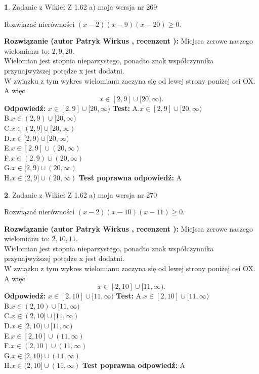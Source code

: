 \documentclass[12pt, a4paper]{article}
\theoremstyle{definition} %
\newtheorem{zad}{}
\newcommand{\zadStart}[1]{\begin{zad}#1\newline}
\newcommand{\zadStop}{\end{zad}}
\newcommand{\rozwStart}[2]{\noindent \textbf{Rozwiązanie (autor #1 , recenzent #2): }\newline}
\newcommand{\rozwStop}{\newline}
\newcommand{\odpStart}{\noindent \textbf{Odpowiedź:}\newline}
\newcommand{\odpStop}{\newline}
\newcommand{\testStart}{\noindent \textbf{Test:}\newline}
\newcommand{\testStop}{\newline}
\newcommand{\kluczStart}{\noindent \textbf{Test poprawna odpowiedź:}\newline}
\newcommand{\kluczStop}{\newline}
\begin{document}
\zadStart{Zadanie z Wikieł Z 1.62 a) moja wersja nr 269}

Rozwiązać nierówności $(x-2)(x-9)(x-20)\ge0$.
\zadStop
\rozwStart{Patryk Wirkus}{}
Miejsca zerowe naszego wielomianu to: $2, 9, 20$.\\
Wielomian jest stopnia nieparzystego, ponadto znak współczynnika przy\linebreak najwyższej potędze x jest dodatni.\\ W związku z tym wykres wielomianu zaczyna się od lewej strony poniżej osi OX. A więc $$x \in [2,9] \cup [20,\infty).$$
\rozwStop
\odpStart
$x \in [2,9] \cup [20,\infty)$
\odpStop
\testStart
A.$x \in [2,9] \cup [20,\infty)$\\
B.$x \in (2,9) \cup [20,\infty)$\\
C.$x \in (2,9] \cup [20,\infty)$\\
D.$x \in [2,9) \cup [20,\infty)$\\
E.$x \in [2,9] \cup (20,\infty)$\\
F.$x \in (2,9) \cup (20,\infty)$\\
G.$x \in [2,9) \cup (20,\infty)$\\
H.$x \in (2,9] \cup (20,\infty)$
\testStop
\kluczStart
A
\kluczStop



\zadStart{Zadanie z Wikieł Z 1.62 a) moja wersja nr 270}

Rozwiązać nierówności $(x-2)(x-10)(x-11)\ge0$.
\zadStop
\rozwStart{Patryk Wirkus}{}
Miejsca zerowe naszego wielomianu to: $2, 10, 11$.\\
Wielomian jest stopnia nieparzystego, ponadto znak współczynnika przy\linebreak najwyższej potędze x jest dodatni.\\ W związku z tym wykres wielomianu zaczyna się od lewej strony poniżej osi OX. A więc $$x \in [2,10] \cup [11,\infty).$$
\rozwStop
\odpStart
$x \in [2,10] \cup [11,\infty)$
\odpStop
\testStart
A.$x \in [2,10] \cup [11,\infty)$\\
B.$x \in (2,10) \cup [11,\infty)$\\
C.$x \in (2,10] \cup [11,\infty)$\\
D.$x \in [2,10) \cup [11,\infty)$\\
E.$x \in [2,10] \cup (11,\infty)$\\
F.$x \in (2,10) \cup (11,\infty)$\\
G.$x \in [2,10) \cup (11,\infty)$\\
H.$x \in (2,10] \cup (11,\infty)$
\testStop
\kluczStart
A
\kluczStop
\end{document}
